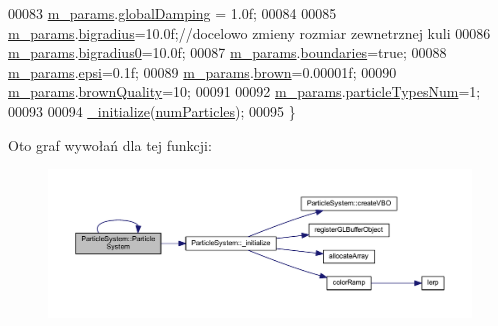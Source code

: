 \begin{DoxyCode}
00083     \hyperlink{class_particle_system_ab765472aed6a1b5f0d2f98a3a906c417}{m\_params}.\hyperlink{struct_sim_params_a7058bad8c867d9d42d8c9d842638ebea}{globalDamping} = 1.0f;
00084 
00085         \hyperlink{class_particle_system_ab765472aed6a1b5f0d2f98a3a906c417}{m\_params}.\hyperlink{struct_sim_params_af41979948fdd8f76fe28ce2b43eb24cd}{bigradius}=10.0f;\textcolor{comment}{//docelowo zmieny rozmiar zewnetrznej kuli}
00086         \hyperlink{class_particle_system_ab765472aed6a1b5f0d2f98a3a906c417}{m\_params}.\hyperlink{struct_sim_params_a5809a1ec819f5a99e350ed28b01834fc}{bigradius0}=10.0f;
00087         \hyperlink{class_particle_system_ab765472aed6a1b5f0d2f98a3a906c417}{m\_params}.\hyperlink{struct_sim_params_a01507f06cc018071a0eb741438aaa09b}{boundaries}=\textcolor{keyword}{true};
00088         \hyperlink{class_particle_system_ab765472aed6a1b5f0d2f98a3a906c417}{m\_params}.\hyperlink{struct_sim_params_a760551182a6dff0b67f3048daa2620fb}{epsi}=0.1f;
00089         \hyperlink{class_particle_system_ab765472aed6a1b5f0d2f98a3a906c417}{m\_params}.\hyperlink{struct_sim_params_a88dae34e74c9184adfa9169bad06d0ee}{brown}=0.00001f;
00090         \hyperlink{class_particle_system_ab765472aed6a1b5f0d2f98a3a906c417}{m\_params}.\hyperlink{struct_sim_params_a366145dd58e2e7eacebffcbe78dd89ff}{brownQuality}=10;
00091 
00092         \hyperlink{class_particle_system_ab765472aed6a1b5f0d2f98a3a906c417}{m\_params}.\hyperlink{struct_sim_params_adc3e5f65a1a0ef7c944007ac99eb8034}{particleTypesNum}=1;
00093 
00094     \hyperlink{class_particle_system_a484988642e046424d32a13709204e8de}{\_initialize}(\hyperlink{particles_8cpp_a05b8a90212054a3eb1a036ae0c269596}{numParticles});
00095 \}
\end{DoxyCode}


Oto graf wywołań dla tej funkcji\-:\nopagebreak
\begin{figure}[H]
\begin{center}
\leavevmode
\includegraphics[width=350pt]{class_particle_system_a8a2be3e93616aa694801369c8b8d12cb_cgraph}
\end{center}
\end{figure}




